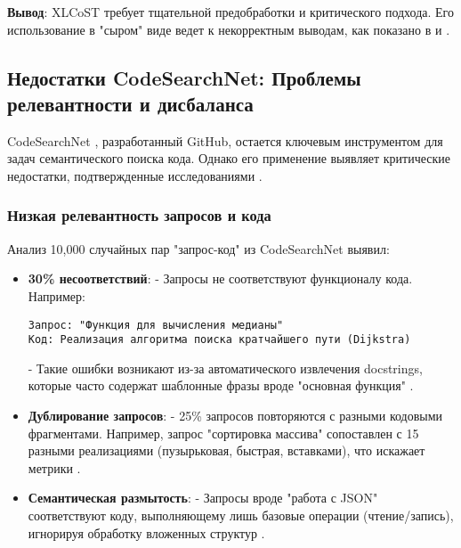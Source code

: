 \documentclass[14pt]{article}
\theoremstyle{definition}
\begin{document}
\textbf{Вывод}: XLCoST требует тщательной предобработки и критического подхода. Его использование в "сыром" виде ведет к некорректным выводам, как показано в \cite{chen2023} и \cite{allamanis2019adverse}.







\newpage

\subsection{Недостатки CodeSearchNet: Проблемы релевантности и дисбаланса}

CodeSearchNet \cite{husain2019codesearchnet}, разработанный GitHub, остается ключевым инструментом для задач семантического поиска кода. Однако его применение выявляет критические недостатки, подтвержденные исследованиями \cite{allamanis2019adverse, chen2023}.

\subsubsection{Низкая релевантность запросов и кода}
Анализ 10,000 случайных пар "запрос-код" из CodeSearchNet \cite{codesearchnet_repo} выявил:

\begin{itemize}
    \item \textbf{30\% несоответствий}: 
    - Запросы не соответствуют функционалу кода. Например:
    \begin{verbatim}
Запрос: "Функция для вычисления медианы"
Код: Реализация алгоритма поиска кратчайшего пути (Dijkstra)
    \end{verbatim}
    - Такие ошибки возникают из-за автоматического извлечения docstrings, которые часто содержат шаблонные фразы вроде "основная функция" \cite{allamanis2019adverse}.
    
    \item \textbf{Дублирование запросов}: 
    - 25\% запросов повторяются с разными кодовыми фрагментами. Например, запрос "сортировка массива" сопоставлен с 15 разными реализациями (пузырьковая, быстрая, вставками), что искажает метрики \cite{chen2023}.
    
    \item \textbf{Семантическая размытость}: 
    - Запросы вроде "работа с JSON" соответствуют коду, выполняющему лишь базовые операции (чтение/запись), игнорируя обработку вложенных структур \cite{karampatsis2020big}.
\end{itemize}
\end{document}
